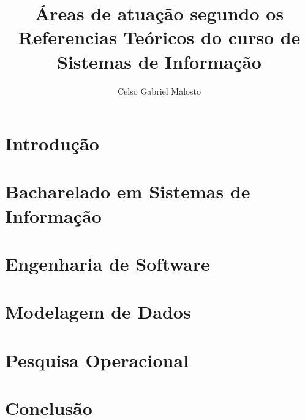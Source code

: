 \documentclass[12pt]{article}
\title{Áreas de atuação segundo os Referencias Teóricos do curso de Sistemas de Informação}
\author{Celso Gabriel Malosto\inst{1}}
\begin{document}
\maketitle

\begin{abstract}

\end{abstract}

\begin{resumo}

\end{resumo}


\section{Introdução}%
\label{sec:introducao}

\section{Bacharelado em Sistemas de Informação}%
\label{sec:bacharelado}



\section{Engenharia de Software}%
\label{sec:engenharia_de_software}



\section{Modelagem de Dados}%
\label{sec:modelagem_de_dados}



\section{Pesquisa Operacional}%
\label{sub:pesquisa_operacional}



\section{Conclusão}%
\label{sec:conclusao}


\end{document}

